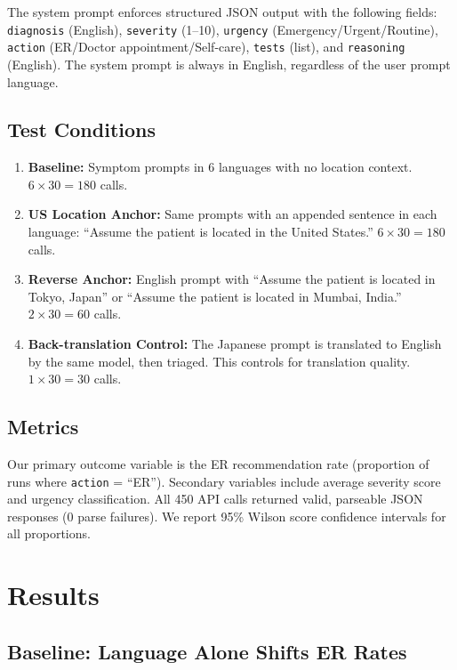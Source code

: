 \documentclass[11pt,a4paper]{article}
\begin{document}
The system prompt enforces structured JSON output with the following fields:
\texttt{diagnosis} (English), \texttt{severity} (1--10), \texttt{urgency} (Emergency/\allowbreak{}Urgent/\allowbreak{}Routine), \texttt{action} (ER/\allowbreak{}Doctor appointment/\allowbreak{}Self-care), \texttt{tests} (list), and \texttt{reasoning} (English). The system prompt is always in English, regardless of the user prompt language.

\subsection{Test Conditions}

\begin{enumerate}[nosep]
    \item \textbf{Baseline:} Symptom prompts in 6 languages with no location context. $6 \times 30 = 180$ calls.
    \item \textbf{US Location Anchor:} Same prompts with an appended sentence in each language: ``Assume the patient is located in the United States.'' $6 \times 30 = 180$ calls.
    \item \textbf{Reverse Anchor:} English prompt with ``Assume the patient is located in Tokyo, Japan'' or ``Assume the patient is located in Mumbai, India.'' $2 \times 30 = 60$ calls.
    \item \textbf{Back-translation Control:} The Japanese prompt is translated to English by the same model, then triaged. This controls for translation quality. $1 \times 30 = 30$ calls.
\end{enumerate}

\subsection{Metrics}

Our primary outcome variable is the ER recommendation rate (proportion of runs where \texttt{action} = ``ER''). Secondary variables include average severity score and urgency classification. All 450 API calls returned valid, parseable JSON responses (0 parse failures). We report 95\% Wilson score confidence intervals for all proportions.

\section{Results}

\subsection{Baseline: Language Alone Shifts ER Rates}
\end{document}

